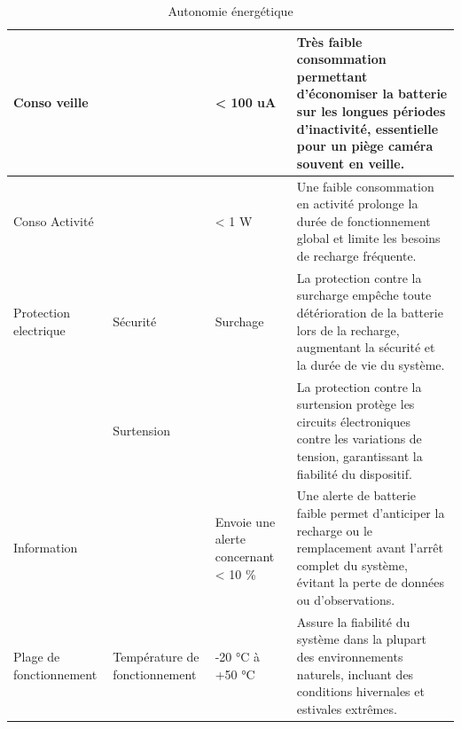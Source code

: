 \begin{table}[ht]
\begin{tabularx}{\textwidth}{|p{3cm}|p{2.3cm}|p{2.2cm}|X|}
      \hline
      Conso veille            &                               & < 100 uA                             & Très faible consommation permettant d'économiser la batterie sur les longues périodes d'inactivité, essentielle pour un piège caméra souvent en veille.                                 \\
      \hline
      Conso Activité          &                               & < 1 W                                & Une faible consommation en activité prolonge la durée de fonctionnement global et limite les besoins de recharge fréquente.                                                             \\
      \hline
      Protection electrique   & Sécurité                      & Surchage                             & La protection contre la surcharge empêche toute détérioration de la batterie lors de la recharge, augmentant la sécurité et la durée de vie du système.                                 \\
      \hline
                              & Surtension                    &                                      & La protection contre la surtension protège les circuits électroniques contre les variations de tension, garantissant la fiabilité du dispositif.                                        \\
      \hline
      Information             &                               & Envoie une alerte concernant < 10 \% & Une alerte de batterie faible permet d'anticiper la recharge ou le remplacement avant l'arrêt complet du système, évitant la perte de données ou d'observations.                        \\
      \hline
      Plage de fonctionnement & Température de fonctionnement & -20 °C à +50 °C                      & Assure la fiabilité du système dans la plupart des environnements naturels, incluant des conditions hivernales et estivales extrêmes.                                                   \\
      \hline
   \end{tabularx}
   \caption{Autonomie énergétique}
\end{table}


